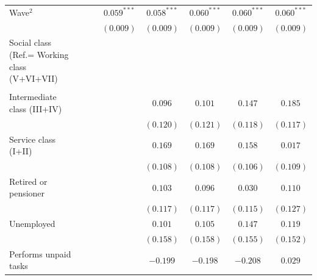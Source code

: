 \documentclass[
  12pt,
]{article}
\begin{document}
\begin{table}
\begin{center}
{\begin{tabular}{l c c c c c c c}
Wave$^2$                                              &                &                & $0.059^{***}$  & $0.058^{***}$  & $0.060^{***}$  & $0.060^{***}$ & $0.060^{***}$  \\
                                                      &                &                & $(0.009)$      & $(0.009)$      & $(0.009)$      & $(0.009)$     & $(0.009)$      \\
Social class (Ref.= Working class (V+VI+VII)          &                &                &                &                &                &               &                \\
                                                      &                &                &                &                &                &               &                \\
\quad Intermediate class (III+IV)                     &                &                &                & $0.096$        & $0.101$        & $0.147$       & $0.185$        \\
                                                      &                &                &                & $(0.120)$      & $(0.121)$      & $(0.118)$     & $(0.117)$      \\
\quad Service class (I+II)                            &                &                &                & $0.169$        & $0.169$        & $0.158$       & $0.017$        \\
                                                      &                &                &                & $(0.108)$      & $(0.108)$      & $(0.106)$     & $(0.109)$      \\
\quad Retired or pensioner                            &                &                &                & $0.103$        & $0.096$        & $0.030$       & $0.110$        \\
                                                      &                &                &                & $(0.117)$      & $(0.117)$      & $(0.115)$     & $(0.127)$      \\
\quad Unemployed                                      &                &                &                & $0.101$        & $0.105$        & $0.147$       & $0.119$        \\
                                                      &                &                &                & $(0.158)$      & $(0.158)$      & $(0.155)$     & $(0.152)$      \\
\quad Performs unpaid tasks                           &                &                &                & $-0.199$       & $-0.198$       & $-0.208$      & $0.029$        \\

\end{tabular}}
\end{center}
\end{table}
\end{document}
